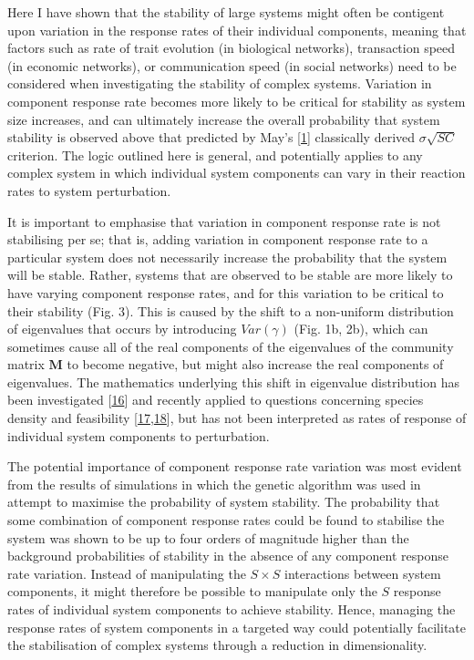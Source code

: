 \documentclass[]{article}
\begin{document}
Here I have shown that the stability of large systems might often be
contigent upon variation in the response rates of their individual
components, meaning that factors such as rate of trait evolution (in
biological networks), transaction speed (in economic networks), or
communication speed (in social networks) need to be considered when
investigating the stability of complex systems. Variation in component
response rate becomes more likely to be critical for stability as system
size increases, and can ultimately increase the overall probability that
system stability is observed above that predicted by May's
{[}\protect\hyperlink{ref-May1972}{1}{]} classically derived
\(\sigma \sqrt{SC}\) criterion. The logic outlined here is general, and
potentially applies to any complex system in which individual system
components can vary in their reaction rates to system perturbation.

It is important to emphasise that variation in component response rate
is not stabilising per se; that is, adding variation in component
response rate to a particular system does not necessarily increase the
probability that the system will be stable. Rather, systems that are
observed to be stable are more likely to have varying component response
rates, and for this variation to be critical to their stability (Fig.
3). This is caused by the shift to a non-uniform distribution of
eigenvalues that occurs by introducing \(Var(\gamma)\) (Fig. 1b, 2b),
which can sometimes cause all of the real components of the eigenvalues
of the community matrix \(\mathbf{M}\) to become negative, but might
also increase the real components of eigenvalues. The mathematics
underlying this shift in eigenvalue distribution has been investigated
{[}\protect\hyperlink{ref-Ahmadian2015}{16}{]} and recently applied to
questions concerning species density and feasibility
{[}\protect\hyperlink{ref-Gibbs2017}{17},\protect\hyperlink{ref-Stone2017}{18}{]},
but has not been interpreted as rates of response of individual system
components to perturbation.

The potential importance of component response rate variation was most
evident from the results of simulations in which the genetic algorithm
was used in attempt to maximise the probability of system stability. The
probability that some combination of component response rates could be
found to stabilise the system was shown to be up to four orders of
magnitude higher than the background probabilities of stability in the
absence of any component response rate variation. Instead of
manipulating the \(S \times S\) interactions between system components,
it might therefore be possible to manipulate only the \(S\) response
rates of individual system components to achieve stability. Hence,
managing the response rates of system components in a targeted way could
potentially facilitate the stabilisation of complex systems through a
reduction in dimensionality.
\end{document}
